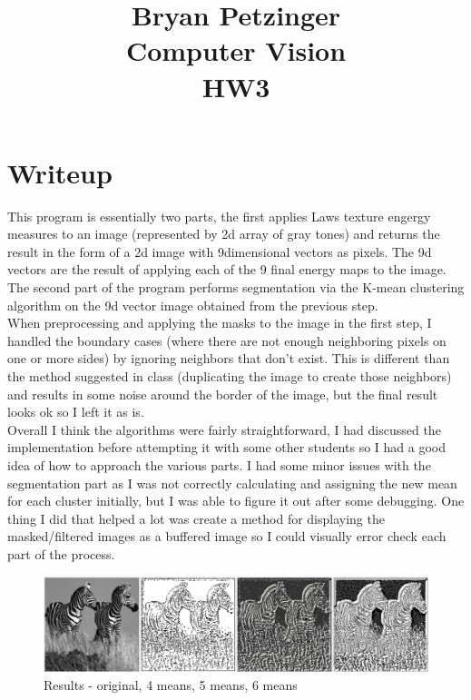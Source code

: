 \documentclass[12pt]{article}
\title{
Bryan Petzinger \\
Computer Vision \\
HW3 \\
}
\begin{document}
\section{Writeup}
This program is essentially two parts, the first applies Laws texture engergy measures to an image (represented by 2d array of gray tones) and returns the result in the form of a 2d image with 9dimensional vectors as pixels. The 9d vectors are the result of applying each of the 9 final energy maps to the image. The second part of the program performs segmentation via the K-mean clustering algorithm on the 9d vector image obtained from the previous step. \\

When preprocessing and applying the masks to the image in the first step, I handled the boundary cases (where there are not enough neighboring pixels on one or more sides) by ignoring neighbors that don't exist. This is different than the method suggested in class (duplicating the image to create those neighbors) and results in some noise around the border of the image, but the final result looks ok so I left it as is. \\

Overall I think the algorithms were fairly straightforward, I had discussed the implementation before attempting it with some other students so I had a good idea of how to approach the various parts. I had some minor issues with the segmentation part as I was not correctly calculating and assigning the new mean for each cluster initially, but I was able to figure it out after some debugging. One thing I did that helped a lot was create a method for displaying the masked/filtered images as a buffered image so I could visually error check each part of the process.


\begin{figure}[htb]
\includegraphics[scale=.5]{result.PNG}
\caption{Results - original, 4 means, 5 means, 6 means}
\end{figure}
\end{document}
